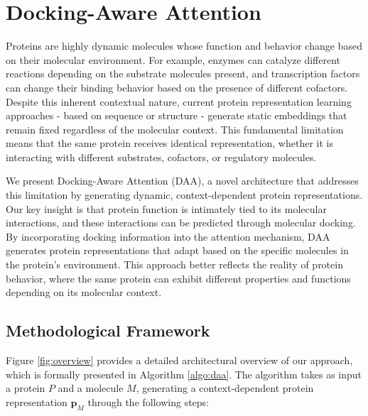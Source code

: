 \documentclass[sigconf]{acmart}
\begin{document}


\section{Docking-Aware Attention}
Proteins are highly dynamic molecules whose function and behavior change based on their molecular environment. For example, enzymes can catalyze different reactions depending on the substrate molecules present, and transcription factors can change their binding behavior based on the presence of different cofactors. Despite this inherent contextual nature, current protein representation learning approaches - based on sequence or structure - generate static embeddings that remain fixed regardless of the molecular context. This fundamental limitation means that the same protein receives identical representation, whether it is interacting with different substrates, cofactors, or regulatory molecules.

We present Docking-Aware Attention (DAA), a novel architecture that addresses this limitation by generating dynamic, context-dependent protein representations. Our key insight is that protein function is intimately tied to its molecular interactions, and these interactions can be predicted through molecular docking. By incorporating docking information into the attention mechanism, DAA generates protein representations that adapt based on the specific molecules in the protein's environment. This approach better reflects the reality of protein behavior, where the same protein can exhibit different properties and functions depending on its molecular context.


\subsection{Methodological Framework}
Figure \ref{fig:overview} provides a detailed architectural overview of our approach, which is formally presented in Algorithm \ref{algo:daa}. The algorithm takes as input a protein $P$ and a molecule $M$, generating a context-dependent protein representation $\mathbf{p}_M$ through the following steps:
\end{document}
